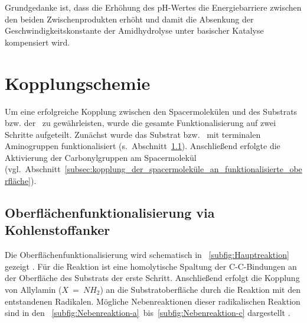 Grundgedanke ist, dass die Erhöhung des pH-Wertes die Energiebarriere zwischen den beiden Zwischenprodukten erhöht und damit die Absenkung der Geschwindigkeitskonstante der Amidhydrolyse unter basischer Katalyse kompensiert wird.

\section{Kopplungschemie}
\label{sec:kopplungschemie}

Um eine erfolgreiche Kopplung zwischen den Spacermolekülen und  des Substrats bzw. der \spitze~zu gewährleisten, wurde die gesamte Funktionalisierung auf zwei Schritte aufgeteilt. Zunächst wurde das Substrat bzw. \spitze~mit terminalen Aminogruppen funktionalisiert (s.~Abschnitt~\ref{subsec:oberflächenfunktionalisierung_via_kohlenstoffanker}). Anschließend erfolgte die Aktivierung der Carbonylgruppen am Spacermolekül (vgl.~Abschnitt~\ref{subsec:kopplung_der_spacermoleküle_an_funktionalisierte_oberfläche}). 

\subsection{Oberflächenfunktionalisierung via Kohlenstoffanker}
\label{subsec:oberflächenfunktionalisierung_via_kohlenstoffanker}

Die Oberflächenfunktionalisierung wird schematisch in \abb~\ref{subfig:Hauptreaktion} gezeigt \cite{MichaelF.Pill.2015}. Für die Reaktion ist eine homolytische Spaltung der C-C-Bindungen an der Oberfläche des Substrats der erste Schritt. Anschließend erfolgt die Kopplung von Allylamin ($X~=~NH_2$) an die Substratoberfläche durch die Reaktion mit den entstandenen Radikalen. Mögliche Nebenreaktionen dieser radikalischen Reaktion sind in den \abbn~\ref{subfig:Nebenreaktion-a}~bis~\ref{subfig:Nebenreaktion-c} dargestellt \cite{MichaelF.Pill.2015}.

